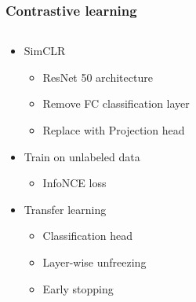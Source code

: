 \documentclass{beamer}
\begin{document}
\begin{frame}
\frametitle{Contrastive learning}
\begin{columns}
\begin{column}{0.5\textwidth}
\begin{itemize}
\setlength{\itemsep}{2em}  

    \item SimCLR 
    \begin{itemize}
        \item ResNet 50 architecture
	   \item Remove FC classification layer 
        \item Replace with Projection head \cite{SimCL}
    \end{itemize}
    \item Train on unlabeled data
    \begin{itemize}
        \item InfoNCE loss \cite{infoloss}
    \end{itemize}
    
    \item Transfer learning
    \begin{itemize}
        \item Classification head
        \item Layer-wise unfreezing
        \item Early stopping
    \end{itemize}
\end{itemize}


\end{column}
\end{columns}
\end{frame}
\end{document}
